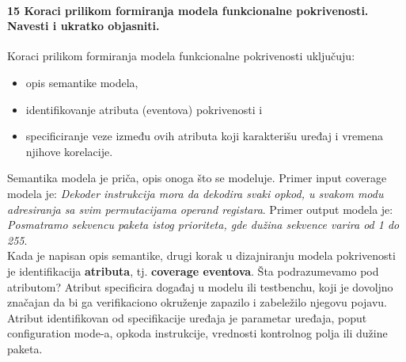 \documentclass[a4paper, 12pt]{article}
\begin{document}
\paragraph{15 Koraci prilikom formiranja modela funkcionalne pokrivenosti. Navesti i ukratko objasniti.}
\hfill \break
\indent Koraci prilikom formiranja modela funkcionalne pokrivenosti uključuju:
\begin{itemize}
\item opis semantike modela,
\item identifikovanje atributa (eventova) pokrivenosti i
\item specificiranje veze između ovih atributa koji karakterišu uređaj i vremena njihove korelacije. 
\end{itemize}
\indent Semantika modela je priča, opis onoga što se modeluje. Primer input coverage modela je: \textit{Dekoder instrukcija mora da dekodira svaki opkod, u svakom modu adresiranja sa svim permutacijama operand registara}. Primer output modela je: \textit{Posmatramo sekvencu paketa istog prioriteta, gde dužina sekvence varira od 1 do 255}.\\
\indent Kada je napisan opis semantike, drugi korak u dizajniranju modela pokrivenosti je identifikacija \textbf{atributa}, tj. \textbf{coverage eventova}. Šta podrazumevamo pod atributom? Atribut specificira događaj u modelu ili testbenchu, koji je dovoljno značajan da bi ga verifikaciono okruženje zapazilo i zabeležilo njegovu pojavu. Atribut identifikovan od specifikacije uređaja je parametar uređaja, poput configuration mode-a, opkoda instrukcije, vrednosti kontrolnog polja ili dužine paketa.
\end{document}
